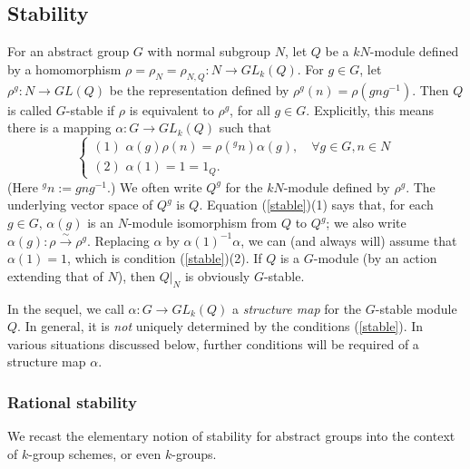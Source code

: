 \documentclass[11pt,leqno,amscd,amssymb,verbatim, url]{amsart}
\theoremstyle{definition}
\numberwithin{equation}{thm}
\begin{document}
 \subsection{Stability}
 For an abstract group $G$ with normal subgroup $N$, let $Q$ be a $kN$-module defined by
 a homomorphism  $\rho=\rho_N=\rho_{N,Q}:N\to GL_k(Q)$. For
$g\in G$, let $\rho^g:N\to GL(Q)$ be the representation defined by $\rho^g(n)=\rho(gng^{-1})$. Then $Q$ is called $G$-stable if
$\rho$ is equivalent to $\rho^g$, for all $g\in G$. Explicitly, this means there is a mapping $\alpha:G\to GL_k(Q)$
such that
\begin{equation}\label{stable}\begin{cases} (1)\,\,
\alpha(g)\rho(n)=\rho({^gn})\alpha(g),\quad\forall g\in G, n\in N\\
(2) \,\,\alpha(1)=1=1_Q.\end{cases}\end{equation}
(Here $^gn:=gng^{-1}$.)
We often write $Q^g$ for the $kN$-module defined by $\rho^g$. The underlying vector space of $Q^g$ 
is $Q$. Equation (\ref{stable})(1) says that, for each $g\in G$,
$\alpha(g)$ is an $N$-module isomorphism from $Q$ to $Q^g$; we also write $\alpha(g):\rho\overset\sim\to\rho^g$.
 Replacing $\alpha$ by $\alpha(1)^{-1}\alpha$, we can (and always
will) assume that $\alpha(1)=1$, which is condition (\ref{stable})(2).   If $Q$ is a $G$-module (by an action extending that of $N$), then $Q|_N$ is obviously $G$-stable. 

In the sequel, we call $\alpha:G\to GL_k(Q)$ a {\it structure map} for the $G$-stable module $Q$. In general, it is
{\it not} uniquely determined by the conditions (\ref{stable}). In various situations discussed below, further conditions will be required of a structure 
map $\alpha$. 

\subsubsection{Rational stability} We recast the elementary notion of stability for abstract groups into
the context of $k$-group schemes, or even $k$-groups.
\end{document}
